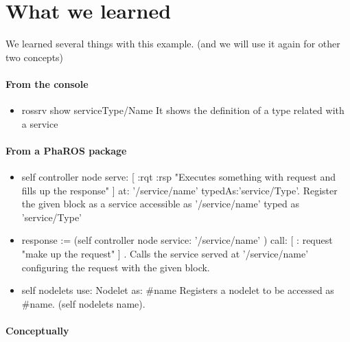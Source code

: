\documentclass[a4paper,10pt,twoside]{book}
\begin{document}
			
				
			\section{What we learned}
			
				We learned several things with this example. (and we will use it again for other two concepts)
				
				
				\paragraph{From the console \newline}
				
				\begin{itemize}
					\item rossrv show serviceType/Name
						\newline \-\- It shows the definition of a type related with a service
				\end{itemize}
				
				\paragraph{From a PhaROS package  \newline}
				
				\begin{itemize}
					\item self controller node serve: [ :rqt :rsp \textpipe{} "Executes something with request and fills up the response" ] at: '/service/name' typedAs:'service/Type'.
						\newline \-\- Register the given block as a service accessible as '/service/name' typed as 'service/Type'
					\item response := (self controller node service: '/service/name' ) call: [ : request \textpipe{} "make up the request" ] .
						\newline \-\- Calls the service served at '/service/name' configuring the request with the given block. 
					\item self nodelets use: Nodelet as: \#name 
						\newline \-\- Registers a nodelet to be accessed as \#name. (self nodelets name).
		
				\end{itemize}
			
				\paragraph{Conceptually \newline}
				
\end{document}
